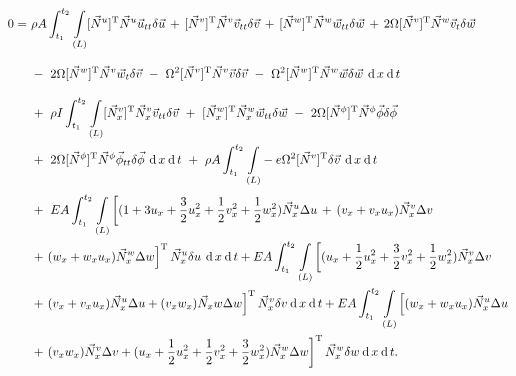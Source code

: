 	\begin{equation}\label{equ:Schwache-Formulierung-Bewegung-Ggl}
	\begin{aligned}
	0= \ & \rho A \int_{t_{1}}^{t_{2}}\underset{(L)}{\int} [\vec{N}^{u}]^{\mathrm{T}}\vec{N}^{u}\vec{u}_{tt}\delta \vec{u} \, + \,  [\vec{N}^{v}]^{\mathrm{T}}\vec{N}^{v}\vec{v}_{tt}\delta \vec{v} \, + \, [\vec{N}^{w}]^{\mathrm{T}}\vec{N}^{w}\vec{w}_{tt}\delta \vec{w} \, + \, 2\Omega[\vec{N}^{v}]^{\mathrm{T}}\vec{N}^{w}\vec{v}_{t}\delta \vec{w} \\[3mm]
	& - \ 2\Omega[\vec{N}^{w}]^{\mathrm{T}}\vec{N}^{v}\vec{w}_{t}\delta \vec{v} \ - \ \Omega^{2}[\vec{N}^{v}]^{\mathrm{T}}\vec{N}^{v}\vec{v}\delta \vec{v} \ - \ \Omega^{2}[\vec{N}^{w}]^{\mathrm{T}}\vec{N}^{w}\vec{w}\delta \vec{w} \, \dx \dt\\[3mm]
	& + \ \rho I \int_{t_{1}}^{t_{2}}\underset{(L)}{\int} [\vec{N}_{x}^{v}]^{\mathrm{T}}\vec{N}_{x}^{v}\vec{v}_{tt}\delta \vec{v} \ + \ [\vec{N}_{x}^{w}]^{\mathrm{T}}\vec{N}_{x}^{w}\vec{w}_{tt}\delta \vec{w} \ - \ 2\Omega[\vec{N}^{\phi}]^{\mathrm{T}}\vec{N}^{\phi}\vec{\phi}\delta \vec{\phi} \\
	& + \ 2\Omega[\vec{N}^{\phi}]^{\mathrm{T}}\vec{N}^{\phi}\vec{\phi}_{tt}\delta \vec{\phi} \, \dx \dt \ + \ \rho A \int_{t_{1}}^{t_{2}}\underset{(L)}{\int} -e\Omega^{2}[\vec{N}^{v}]^{\mathrm{T}}\delta \vec{v} \, \dx \dt\\[1mm]
	& + \ EA\int_{t_{1}}^{t_{2}}\underset{(L)}{\int} \left[ (1+3u_{x}+\dfrac{3}{2}u_{x}^{2}+\dfrac{1}{2}v_{x}^{2}+\dfrac{1}{2}w_{x}^{2})\vec{N}^{u}_{x}\Delta u \, + \, (v_{x}+v_{x}u_{x})\vec{N}^{v}_{x}\Delta v\right. \\
	& +  \left.  ( w_{x}+w_{x}u_{x} )\vec{N}^{w}_{x}\Delta w\right]^{\mathrm{T}}\vec{N}^{u}_{x} \delta u \, \dx \dt + EA\int_{t_{1}}^{t_{2}}\underset{(L)}{\int} \left[ (u_{x}+\dfrac{1}{2}u_{x}^{2}+\dfrac{3}{2}v_{x}^{2}+\dfrac{1}{2}w_{x}^{2})\vec{N}_{x}^{v}\Delta v \right. \\
	& +  \left. (v_{x}+v_{x}u_{x})\vec{N}_{x}^{u}\Delta u + (v_{x}w_{x})\vec{N}_{x}w\Delta w \right]^{\mathrm{T}} \vec{N}_{x}^{v} \delta v \dx \dt + EA\int_{t_{1}}^{t_{2}}\underset{(L)}{\int} \left[ (w_{x}+w_{x}u_{x})\vec{N}_{x}^{u}\Delta u \right. \\
	& + \left. (v_{x}w_{x})\vec{N}_{x}^{v}\Delta v + (u_{x}+\dfrac{1}{2}u_{x}^{2}+\dfrac{1}{2}v_{x}^{2}+\dfrac{3}{2}w_{x}^{2})\vec{N}_{x}^{w}\Delta w \right]^{\mathrm{T}}\vec{N}_{x}^{w} \delta w \dx \dt .  \\
	\end{aligned}
	\end{equation}
	
